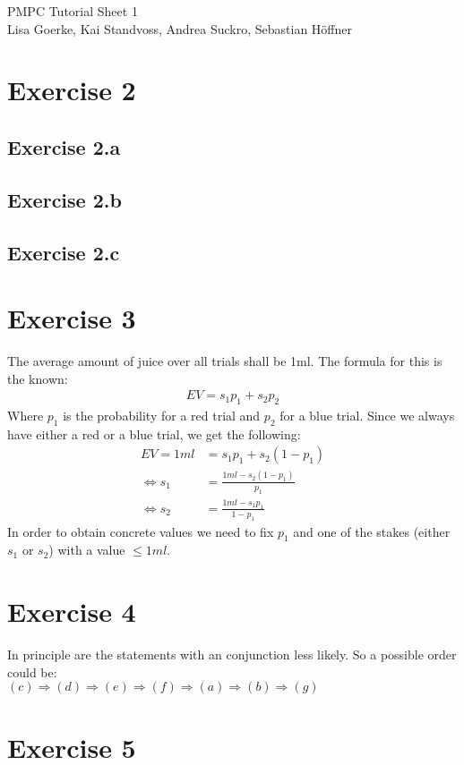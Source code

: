 \documentclass{article}
\begin{document}
\LARGE PMPC Tutorial Sheet 1\\
\small Lisa Goerke, Kai Standvoss, Andrea Suckro, Sebastian H\"offner
\vspace{0.5cm}
\normalsize


\section*{Exercise 2}
\subsection*{Exercise 2.a}




\subsection*{Exercise 2.b}


\subsection*{Exercise 2.c}



\section*{Exercise 3}
The average amount of juice over all trials shall be 1ml. The formula for this is the known:\\
\begin{align}
EV = s_1p_1 + s_2p_2
\end{align}
Where $p_1$ is the probability for a red trial and $p_2$ for a blue trial. Since we always have either a red or a blue trial, we get the following: \\
\begin{align}
EV = 1ml &= s_1p_1 + s_2(1-p_1)\\
\Leftrightarrow s_1 &= \frac{1ml-s_2(1-p_1)}{p_1}\\
\Leftrightarrow s_2 &= \frac{1ml-s_1p_1}{1-p_1}
\end{align}
In order to obtain concrete values we need to fix $p_1$ and one of the stakes (either $s_1$ or $s_2$) with a value $\leq 1ml$.
\section*{Exercise 4}
In principle are the statements with an conjunction less likely. So a possible order could be:\\
$(c)\Rightarrow(d)\Rightarrow(e)\Rightarrow(f)\Rightarrow(a)\Rightarrow(b)\Rightarrow(g)$

\section*{Exercise 5}
\end{document}
